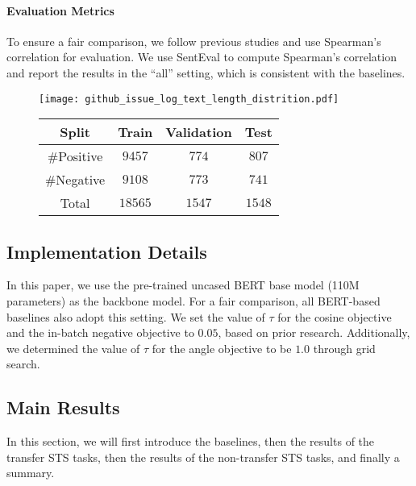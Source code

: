 \documentclass{article} \usepackage{iclr2024_conference,times}
\begin{document}
\paragraph{Evaluation Metrics} To ensure a fair comparison, we follow previous studies and use Spearman's correlation for evaluation. We use SentEval \citep{conneau-kiela-2018-senteval} to compute Spearman's correlation and report the results in the ``all'' setting, which is consistent with the baselines.

\begin{figure}\CenterFloatBoxes
\begin{floatrow}
{
    \texttt{[image: github\_issue\_log\_text\_length\_distrition.pdf]}
}
\killfloatstyle{}
{
    \begin{tabular}{c||ccc}
    \toprule
            Split & Train & Validation & Test \\
    \midrule
    \#Positive & $9457$ & $774$ & $807$ \\
    \#Negative & $9108$ & $773$ & $741$ \\
    \midrule
    Total & $18565$ & $1547$ & $1548$ \\
    \bottomrule
    \end{tabular}
}
\end{floatrow}
\end{figure}

\subsection{Implementation Details}
In this paper, we use the pre-trained uncased BERT base model (110M parameters) as the backbone model. For a fair comparison, all BERT-based baselines also adopt this setting.
We set the value of $\tau$ for the cosine objective and the in-batch negative objective to $0.05$, based on prior research. Additionally, we determined the value of $\tau$ for the angle objective to be $1.0$ through grid search. 

\subsection{Main Results}
\label{sec-main-result}
In this section, we will first introduce the baselines, then the results of the transfer STS tasks, then the results of the non-transfer STS tasks, and finally a summary.
\end{document}
